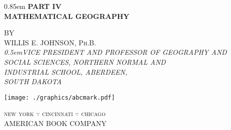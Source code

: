 \documentclass{tufte-book}
\begin{document}
\vfill\eject
\newcommand{\TitleHuge}{\fontsize{32}{40}\selectfont}
\newcommand{\TitleStretch}{\spaceskip0.85em}
\newcommand{\TitleNoStretch}{\spaceskip0.5em}
\newcommand{\vstretch}[1]{\vspace*{\stretch{#1}}}

\begin{fullwidth}
\begin{center}
\TitleStretch
\TitleHuge\selectfont\bfseries
PART IV\\
MATHEMATICAL GEOGRAPHY

\vstretch{1}
\mdseries\normalsize
BY\\[1ex]

\large WILLIS E. JOHNSON, \textsc{Ph.B}.\\[1ex]
\small\textit{\TitleNoStretch VICE PRESIDENT AND PROFESSOR OF GEOGRAPHY AND\\
SOCIAL SCIENCES, NORTHERN NORMAL AND\\
INDUSTRIAL SCHOOL, ABERDEEN,\\
SOUTH DAKOTA}

\vstretch{2}
\texttt{[image: ./graphics/abcmark.pdf]}
\vstretch{2}

\normalsize
\MakeLowercase{\large\scshape NEW YORK}   $\because$
\MakeLowercase{\large\scshape CINCINNATI} $\because$
\MakeLowercase{\large\scshape CHICAGO}\\[1ex]

\large
AMERICAN BOOK COMPANY
\end{center}
\end{fullwidth}

\clearpage
\end{document}
